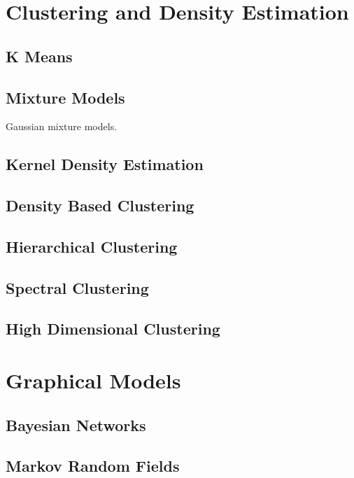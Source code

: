 \documentclass{article}
\begin{document}
\section{Clustering and Density Estimation} 

  \subsection{K Means} 

  \subsection{Mixture Models}

    Gaussian mixture models. 

  \subsection{Kernel Density Estimation} 

  \subsection{Density Based Clustering}

  \subsection{Hierarchical Clustering} 

  \subsection{Spectral Clustering}

  \subsection{High Dimensional Clustering}

\section{Graphical Models} 

  \subsection{Bayesian Networks} 

  \subsection{Markov Random Fields}
\end{document}
